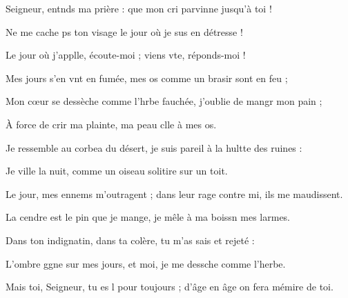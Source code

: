 \item Seigneur, entnds ma prière :\psstar{} que mon cri parvinne jusqu’à toi !
\item Ne me cache ps ton visage\psstar{} le jour où je sus en détresse ! 
\item Le jour où j’applle, écoute-moi ;\psstar{} viens vte, réponds-moi !
\item Mes jours s’en vnt en fumée,\psstar{} mes os comme un brasir sont en feu ;
\item Mon cœur se dessèche comme l’hrbe fauchée,\psstar{} j’oublie de mangr mon pain ;
\item À force de crir ma plainte,\psstar{} ma peau clle à mes os.
\item Je ressemble au corbea du désert,\psstar{} je suis pareil à la hultte des ruines :
\item Je ville la nuit,\psstar{} comme un oiseau solitire sur un toit.
\item Le jour, mes ennems m’outragent ;\psstar{} dans leur rage contre mi, ils me maudissent.
\item La cendre est le pin que je mange,\psstar{} je mêle à ma boissn mes larmes.
\item Dans ton indignatin, dans ta colère,\psstar{} tu m’as sais et rejeté :
\item L’ombre ggne sur mes jours,\psstar{} et moi, je me dessche comme l’herbe.
\item Mais toi, Seigneur, tu es l pour toujours ;\psstar{} d’âge en âge on fera mémire de toi.